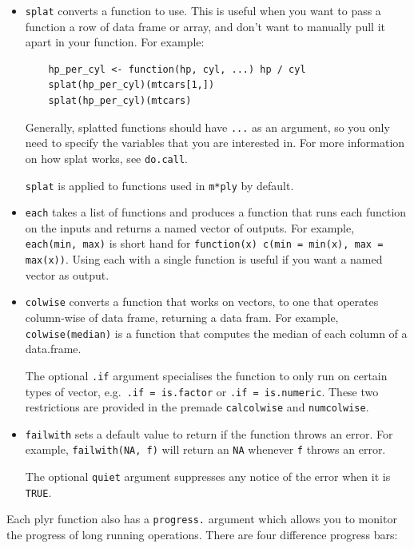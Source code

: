 \documentclass[letterpage]{scrartcl}
\begin{document}
\begin{itemize}
  \item {\tt splat} converts a function to use.  This is useful when you want to pass a function a row of data frame or array, and don't want to manually pull it apart in your function.  For example:
  
  \begin{verbatim}
    hp_per_cyl <- function(hp, cyl, ...) hp / cyl
    splat(hp_per_cyl)(mtcars[1,])
    splat(hp_per_cyl)(mtcars)
  \end{verbatim} 
  
  Generally, splatted functions should have {\tt ...} as an argument, so you only need to specify the variables that you are interested in.  For more information on how splat works, see {\tt do.call}.  
  
  {\tt splat} is applied to functions used in {\tt m*ply} by default.

  \item {\tt each} takes a list of functions and produces a function that runs  each function on the inputs and returns a named vector of outputs.   For example, {\tt each(min, max)} is short hand for {\tt function(x) c(min = min(x), max = max(x))}.  Using each with a single function is useful if you want a named vector as output.

  \item {\tt colwise} converts a function that works on vectors, to one that operates column-wise of data frame, returning a data fram.  For example, {\tt colwise(median)} is a function that computes the median of each column of a data.frame.  
  
  The optional {\tt .if} argument specialises the function to only run on certain types of vector, e.g.\ {\tt .if = is.factor} or {\tt .if = is.numeric}.  These two restrictions are provided in the premade {\tt calcolwise} and {\tt numcolwise}.  
  
  \item {\tt failwith} sets a default value to return if the function throws an error.  For example, {\tt failwith(NA, f)} will return an {\tt NA} whenever {\tt f} throws an error.  
  
  The optional {\tt quiet} argument suppresses any notice of the error when it is {\tt TRUE}.

\end{itemize}

Each plyr function also has a {\tt progress.} argument which allows you to monitor the progress of long running operations.  There are four difference progress bars:
\end{document}
